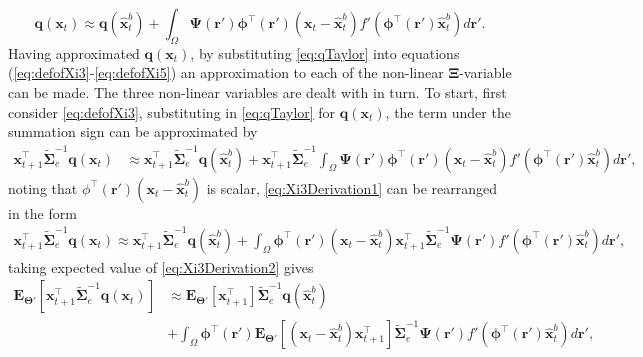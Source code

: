 \documentclass[]{article}
\begin{document}
\begin{equation}\label{eq:qTaylor}
 \mathbf q(\mathbf x_t) \approx \mathbf q(\hat{\mathbf x}_t^b)+\int_\Omega \boldsymbol{\Psi}\left(\mathbf{r}'\right)\boldsymbol \phi^\top\left(\mathbf r'\right) \left(\mathbf x_t -\hat{\mathbf x}_t^b\right)f'\left(\boldsymbol \phi^\top\left(\mathbf r'\right)\hat{\mathbf x}_t^b\right) d\mathbf{r}'.
\end{equation}
Having approximated $\mathbf q\left(\mathbf x_t\right)$, by substituting  \eqref{eq:qTaylor} into equations (\ref{eq:defofXi3}-\ref{eq:defofXi5}) an approximation to each of the non-linear $\boldsymbol\Xi$-variable can be made. The three non-linear variables are dealt with in turn. To start, first consider \eqref{eq:defofXi3}, substituting in \eqref{eq:qTaylor} for $\mathbf q\left(\mathbf x_t\right)$, the term under the summation sign can be approximated by
\begin{align}\label{eq:Xi3Derivation1}
 \mathbf x_{t+1}^\top\tilde{\boldsymbol\Sigma}_e^{-1}\mathbf q( \mathbf x_t) &\approx \mathbf x_{t+1}^\top\tilde{\boldsymbol\Sigma}_e^{-1}\mathbf q(\mathbf {\hat x}_t^b)+\mathbf x_{t+1}^\top\tilde{\boldsymbol\Sigma}_e^{-1}\int_\Omega \boldsymbol{\Psi}(\mathbf{r}')\boldsymbol \phi^\top(\mathbf r') (\mathbf x_t - \mathbf  {\hat x}_t^b)f'(\boldsymbol \phi^\top(\mathbf r')\mathbf {\hat x}_t^b) d\mathbf{r}',
\end{align}
noting that $\phi^\top(\mathbf r') (\mathbf x_t - \mathbf  {\hat x}_t^b)$ is scalar, \eqref{eq:Xi3Derivation1} can be rearranged in the form 
\begin{align}\label{eq:Xi3Derivation2}
 \mathbf x_{t+1}^\top\tilde{\boldsymbol\Sigma}_e^{-1}\mathbf q( \mathbf x_t)\approx\mathbf x_{t+1}^\top\tilde{\boldsymbol\Sigma}_e^{-1}\mathbf q(\mathbf {\hat x}_t^b)+\int_\Omega \boldsymbol \phi^\top(\mathbf r') (\mathbf x_t - \mathbf  {\hat x}_t^b)\mathbf x_{t+1}^\top\tilde{\boldsymbol\Sigma}_e^{-1}\boldsymbol{\Psi}(\mathbf{r}')f'(\boldsymbol \phi^\top(\mathbf r')\mathbf {\hat x}_t^b) d\mathbf{r}',
\end{align}
taking expected value of \eqref{eq:Xi3Derivation2} gives
\begin{align}\label{eq:Xi3Derivation3}
 \mathbf E_{\boldsymbol\Theta'}\left[\mathbf x_{t+1}^\top\tilde{\boldsymbol\Sigma}_e^{-1}\mathbf q( \mathbf x_t)\right] &\approx \mathbf E_{\boldsymbol\Theta'}\left[\mathbf x_{t+1}^\top\right]\tilde{\boldsymbol\Sigma}_e^{-1}\mathbf q(\mathbf {\hat x}_t^b) \nonumber \\
&+\int_\Omega \boldsymbol \phi^\top(\mathbf r')  \mathbf E_{\boldsymbol\Theta'}\left[(\mathbf x_t - \mathbf  {\hat x}_t^b)\mathbf x_{t+1}^\top\right]\tilde{\boldsymbol\Sigma}_e^{-1}\boldsymbol{\Psi}(\mathbf{r}')f'(\boldsymbol \phi^\top(\mathbf r')\mathbf {\hat x}_t^b) d\mathbf{r}',
\end{align}
\end{document}
